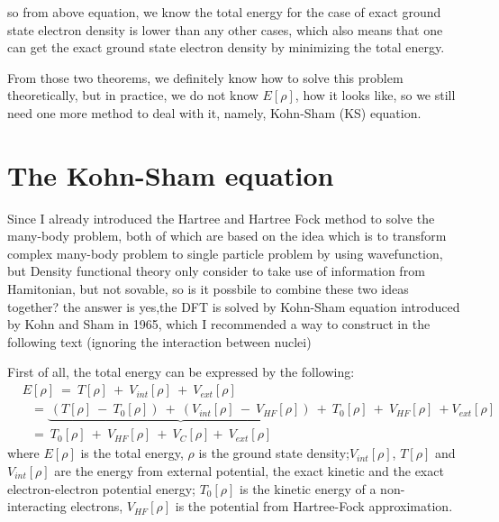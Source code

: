 \documentclass[a4paper, 12pt, titlepage,oneside,drop]{kthesis}
\begin{document}
\noindent so from above equation, we know the total energy for the case of exact ground state electron density is lower than any other cases, which also means that one can get 
the exact ground state electron density by minimizing the total energy.



\noindent From those two theorems, we definitely know how to solve this problem theoretically, but in practice, we do not know $E[\rho]$, how it looks like, 
so we still need one more method to deal with it, namely, Kohn-Sham (KS) equation.

\section{The Kohn-Sham equation}

\noindent Since I already introduced the Hartree and Hartree Fock method to solve the many-body problem, both of which are based on the idea which is to transform complex 
many-body problem to single particle problem by using wavefunction, but Density functional theory only consider to take use of information from Hamitonian, but not sovable, 
so is it possbile to combine these two ideas together? the answer is yes,the DFT is solved by Kohn-Sham equation introduced by Kohn and Sham in 1965,
which I recommended a way to construct in the following text (ignoring the interaction between nuclei)

\noindent First of all, the total energy can be expressed by the following:
\begin{equation}
\label{kse}
\begin{split}
&E[\rho] \ =\ T[\rho] \ + \ V_\textit{int}[\rho] \ + \ V_\textit{ext}[\rho]  \\
&\ \ \   = \underbrace{\ (T[\rho] \ - \ T_{0}[\rho]) \ + \  (V_\textit{int}[\rho] \ - \ V_\textit{HF}[\rho])\ }+ \ T_{0}[\rho] \ + \ V_\textit{HF}[\rho] \ + V_\textit{ext}[\rho]       \\
&\ \ \   = \ T_{0}[\rho] \ + \ V_\textit{HF}[\rho] \ + \ V_\textit{C}[\rho] +\ V_\textit{ext}[\rho]
\end{split}
\end{equation}
\noindent where $E[\rho]$  is the total energy, $\rho$ is the ground state density;$V_\textit{int}[\rho]$, $T[\rho]$ and $V_\textit{int}[\rho]$ are the energy from external potential, the exact kinetic 
and the exact electron-electron potential energy; $T_{0}[\rho]$ is the kinetic energy of a non-interacting electrons, $V_\textit{HF}[\rho]$ is the potential  from Hartree-Fock approximation.
\end{document}
